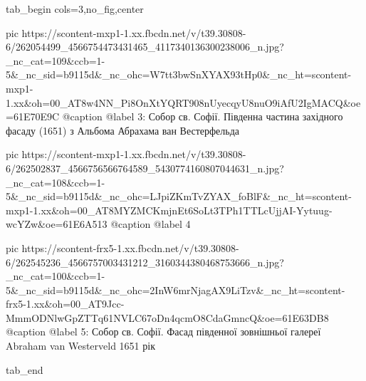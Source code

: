  
 
 
 
 


\ifcmt
  tab_begin cols=3,no_fig,center

     pic https://scontent-mxp1-1.xx.fbcdn.net/v/t39.30808-6/262054499_4566754473431465_4117340136300238006_n.jpg?_nc_cat=109&ccb=1-5&_nc_sid=b9115d&_nc_ohc=W7tt3bwSnXYAX93tHp0&_nc_ht=scontent-mxp1-1.xx&oh=00_AT8w4NN_Pi8OnXtYQRT908nUyecqyU8nuO9iAfU2IgMACQ&oe=61E70E9C
     @caption @label 3: Собор св. Софії. Південна частина західного фасаду (1651) з Альбома Абрахама ван Вестерфельда

     pic https://scontent-mxp1-1.xx.fbcdn.net/v/t39.30808-6/262502837_4566756566764589_5430774160807044631_n.jpg?_nc_cat=108&ccb=1-5&_nc_sid=b9115d&_nc_ohc=LJpiZKmTvZYAX_foBlF&_nc_ht=scontent-mxp1-1.xx&oh=00_AT8MYZMCKmjnEt6SoLt3TPh1TTLcUjjAI-Yytuug-wcYZw&oe=61E6A513
     @caption @label 4

     pic https://scontent-frx5-1.xx.fbcdn.net/v/t39.30808-6/262545236_4566757003431212_3160344380468753666_n.jpg?_nc_cat=100&ccb=1-5&_nc_sid=b9115d&_nc_ohc=2InW6mrNjagAX9LiTzv&_nc_ht=scontent-frx5-1.xx&oh=00_AT9Jcc-MmmODNlwGpZTTq61NVLC67oDn4qcmO8CdaGmncQ&oe=61E63DB8
     @caption @label 5: Собор св. Софії. Фасад південної зовнішньої галереї Abraham van Westerveld 1651 рік

  tab_end
\fi
